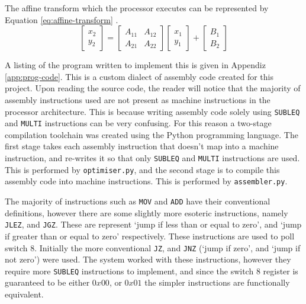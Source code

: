The affine transform which the processor executes can be represented by Equation \ref{eq:affine-transform} \cite{kazmierski2017}.
\begin{equation}
\begin{bmatrix}
x_2\\
y_2
\end{bmatrix}
=
\begin{bmatrix}
A_{11} & A_{12}\\
A_{21} & A_{22}
\end{bmatrix}
\begin{bmatrix}
x_1\\
y_1
\end{bmatrix}
+
\begin{bmatrix}
B_1\\
B_2
\end{bmatrix}
\label{eq:affine-transform}
\end{equation}

A listing of the program written to implement this is given in Appendiz \ref{app:prog-code}. This is a custom dialect of assembly code created for this project. Upon reading the source code, the reader will notice that the majority of assembly instructions used are not present as machine instructions in the processor architecture. This is because writing assembly code solely using \texttt{SUBLEQ} and \texttt{MULTI} instructions can be very confusing. For this reason a two-stage compilation toolchain was created using the Python programming language. The first stage takes each assembly instruction that doesn't map into a machine instruction, and re-writes it so that only \texttt{SUBLEQ} and \texttt{MULTI} instructions are used. This is performed by \texttt{optimiser.py}, and the second stage is to compile this assembly code into machine instructions. This is performed by \texttt{assembler.py}.

The majority of instructions such as \texttt{MOV} and \texttt{ADD} have their conventional definitions, however there are some slightly more esoteric instructions, namely \texttt{JLEZ}, and \texttt{JGZ}. These are represent `jump if less than or equal to zero', and `jump if greater than or equal to zero' respectively. These instructions are used to poll switch 8. Initially the more conventional \texttt{JZ}, and \texttt{JNZ} (`jump if zero', and `jump if not zero') were used. The system worked with these instructions, however they require more \texttt{SUBLEQ} instructions to implement, and since the switch 8 register is guaranteed to be either $0x00$, or $0x01$ the simpler instructions are functionally equivalent.

